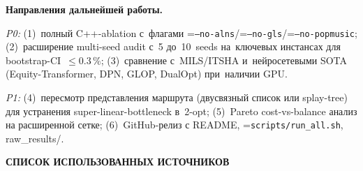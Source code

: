 \documentclass[a4paper,14pt]{extreport}
\makeatletter
\let\old@texttt\texttt
\renewcommand{\texttt}[1]{{\sloppy\hyphenchar\font=\m@ne\old@texttt{#1}}}
\newcommand{\sectiontitle}[1]{%
  \begin{center}\textbf{\MakeUppercase{#1}}\end{center}\par\bigskip}
\makeatother
\begin{document}
\medskip
\noindent\textbf{Направления дальнейшей работы.}

\textit{P0:} (1)~полный C++-ablation с~флагами \texttt{--no-alns}/\texttt{--no-gls}/\texttt{--no-popmusic}; (2)~расширение multi-seed audit с~5 до~10~seeds на~ключевых инстансах для bootstrap-CI~$\leq 0.3\,\%$; (3)~сравнение с~MILS/ITSHA и~нейросетевыми SOTA (Equity-Transformer, DPN, GLOP, DualOpt) при~наличии GPU.

\textit{P1:} (4)~пересмотр представления маршрута (двусвязный список или splay-tree) для устранения super-linear-bottleneck в~2-opt; (5)~Pareto cost-vs-balance анализ на расширенной сетке; (6)~GitHub-релиз с README, \texttt{scripts/run\_all.sh}, raw\_results/.

\newpage
{}
\sectiontitle{Список использованных источников}
\end{document}
